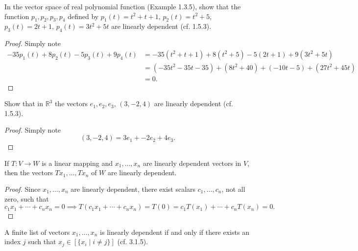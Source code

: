 \begin{tcolorbox}[title=Problem 2, breakable]
    In the vector space of real polynomial 
    function (Example 1.3.5), show that the 
    function $p_1, p_2, p_3, p_4$ defined by 
    $p_1(t) = t^2 + t + 1$,
    $p_2(t) = t^2 + 5$,
    $p_3(t) = 2t + 1$,
    $p_4(t) = 3t^2 + 5t$ are linearly dependent (cf. 1.5.3).
\end{tcolorbox}

\begin{proof}
    Simply note
    \begin{align*}
        -35p_1(t) + 8p_2(t) - 5p_3(t) + 9p_4(t)
        &= -35(t^2+t+1) + 8(t^2+5) - 5(2t+1) + 9(3t^2+5t) \\
        &= (-35t^2 -35t -35) + (8t^2 + 40) + (-10t -5) + (27t^2 + 45t) \\
        &= 0.
    \end{align*}
\end{proof}

\begin{tcolorbox}[title=Problem 3, breakable]
    Show that in $\mathbb{R}^3$ the vectors 
    $e_1, e_2, e_3$, $(3, -2, 4)$ are linearly 
    dependent (cf. 1.5.3).
\end{tcolorbox}

\begin{proof}
    Simply note 
    \[(3, -2, 4) = 3e_1 + -2e_2 + 4e_3.\]
\end{proof}

\begin{tcolorbox}[title=Problem 5, breakable]
    If $T : V \longrightarrow W$ is a linear mapping 
    and $x_1, \ldots, x_n$ are linearly dependent 
    vectors in $V$, then the vectors $Tx_1, \ldots, Tx_n$
    of $W$ are linearly dependent.
\end{tcolorbox}

\begin{proof}
    Since $x_1,\ldots,x_n$ are linearly dependent, there exist scalars
    $c_1,\ldots,c_n$, not all zero, such that
    \[c_1 x_1 + \cdots + c_n x_n = 0 \implies T(c_1 x_1 + \cdots + c_n x_n) = T(0) = c_1 T(x_1) + \cdots + c_n T(x_n) = 0.\]
\end{proof}

\begin{tcolorbox}[title=Problem 6, breakable]
    A finite list of vectors $x_1, \ldots, x_n$ 
    is linearly dependent if and only if 
    there exists an index $j$ such that 
    $x_j \in [\{x_i \mid i \ne j\}]$ (cf. 3.1.5).
\end{tcolorbox}


